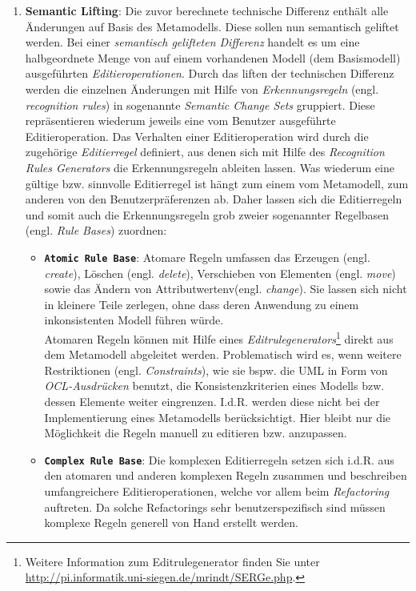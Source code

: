 \documentclass[a4paper]{scrartcl}
\begin{document}
\begin{enumerate}
\item \textbf{Semantic Lifting}:\label{page:semantic_change_sets}
Die zuvor berechnete technische Differenz enthält alle Än\-der\-ung\-en  auf Basis des Metamodells.
Diese sollen nun semantisch geliftet werden.
Bei einer \textit{semantisch gelifteten Differenz} handelt es um eine halbgeordnete Menge von auf einem vorhandenen Modell (dem Basismodell) ausgeführten \textit{Editieroperationen}.
Durch das liften der technischen Differenz werden die einzelnen Änderungen mit Hilfe von \textit{Erkennungsregeln} (engl. \textit{recognition rules}) in sogenannte \textit{Semantic Change Sets} gruppiert. Diese repräsentieren wiederum jeweils eine vom Benutzer ausgeführte Editieroperation.
Das Verhalten einer Editieroperation wird durch die zugehörige \textit{Editierregel} definiert, aus denen sich mit Hilfe des \textit{Recognition Rules Generators} die Erkennungsregeln ableiten lassen. 
Was wiederum eine gültige bzw. sinnvolle Editierregel ist hängt zum einem vom Metamodell, zum anderen von den Benutzerpräferenzen ab. 
Daher lassen sich die Editierregeln und somit auch die Erkennungsregeln grob zweier sogenannter Regelbasen (engl. \textit{Rule Bases}) zuordnen:

\begin{itemize}
\item \textbf{\texttt{Atomic Rule Base}}: 
Atomare Regeln umfassen das Erzeugen (engl. \textit{create}), Löschen (engl. \textit{delete}), Verschieben von Elementen (engl. \textit{move}) sowie das Ändern von Attributwertenv(engl. \textit{change}).
Sie lassen sich nicht in kleinere Teile zerlegen, ohne dass deren Anwendung zu einem inkonsistenten Modell führen würde.\\
Atomaren Regeln können mit Hilfe eines \textit{Editrulegenerators}\footnote{Weitere Information zum Editrulegenerator finden Sie unter \url{http://pi.informatik.uni-siegen.de/mrindt/SERGe.php}.} direkt aus dem Metamodell abgeleitet werden. 
Problematisch wird es, wenn weitere Restriktionen (engl. \textit{Constraints}), wie sie bspw. die UML in Form von \textit{OCL-Ausdrücken} benutzt, die Konsistenzkriterien eines Modells bzw. dessen Elemente weiter eingrenzen. 
I.d.R. werden diese nicht bei der Implementierung eines Metamodells berücksichtigt.
Hier bleibt nur die Möglichkeit die Regeln manuell zu editieren bzw. anzupassen.

\item \textbf{\texttt{Complex Rule Base}}: 
Die komplexen Editierregeln setzen sich i.d.R. aus den atomaren und anderen komplexen Regeln zusammen und beschreiben umfangreichere Editieroperationen, welche vor allem beim \textit{Refactoring} auftreten. 
Da solche Refactorings sehr benutzerspezifisch sind müssen komplexe Regeln generell von Hand erstellt werden.
\end{itemize}


\end{enumerate}
\end{document}
